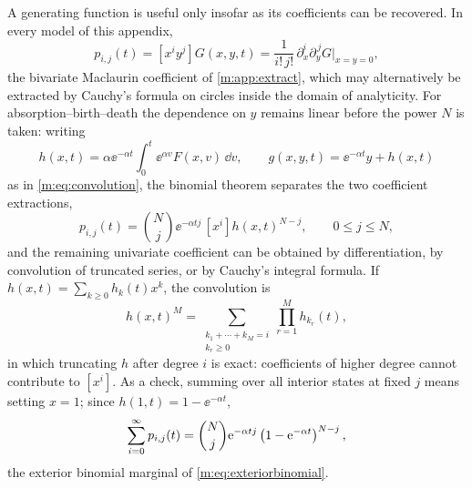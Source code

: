 A generating function is useful only insofar as its coefficients can be
recovered. In every model of this appendix,
\begin{equation}
\label{m:eq:bivariatecoeff}
p_{i,j}(t) = [x^iy^j]G(x,y,t)
= \frac{1}{i!\,j!}\,\partial_x^i\partial_y^{\,j}G\Big|_{x=y=0} ,
\end{equation}
the bivariate Maclaurin coefficient of \cref{m:app:extract}, which may
alternatively be extracted by Cauchy's formula on circles inside the domain of
analyticity. For absorption--birth--death the dependence on $y$ remains linear
before the power $N$ is taken: writing
\begin{equation*}
h(x,t) = \alpha\ee^{-\alpha t}\int_0^t\ee^{\alpha v}F(x,v)\,\dd v,
\qquad
g(x,y,t) = \ee^{-\alpha t}y + h(x,t)
\end{equation*}
as in \cref{m:eq:convolution}, the binomial theorem separates the two
coefficient extractions,
\begin{equation}
\label{m:eq:abdcoeff}
p_{i,j}(t) = \binom{N}{j}\ee^{-\alpha tj}\,[x^i]h(x,t)^{N-j},
\qquad 0\le j\le N ,
\end{equation}
and the remaining univariate coefficient can be obtained by differentiation,
by convolution of truncated series, or by Cauchy's integral formula. If
$h(x,t)=\sum_{k\ge0}h_k(t)x^k$, the convolution is
\begin{equation*}
[x^i]h(x,t)^M
= \sum_{\substack{k_1+\cdots+k_M=i\\k_r\geq0}}\prod_{r=1}^{M}h_{k_r}(t) ,
\end{equation*}
in which truncating $h$ after degree $i$ is exact: coefficients of higher
degree cannot contribute to $[x^i]$. As a check, summing over all interior
states at fixed $j$ means setting $x=1$; since $h(1,t) = 1-\ee^{-\alpha t}$,
\begin{equation*}
\sum_{i=0}^{\infty}p_{i,j}(t)
= \binom{N}{j}\mathrm{e}^{-\alpha tj}\left(1-\mathrm{e}^{-\alpha t}\right)^{N-j},
\end{equation*}
the exterior binomial marginal of \cref{m:eq:exteriorbinomial}.

\FloatBarrier
